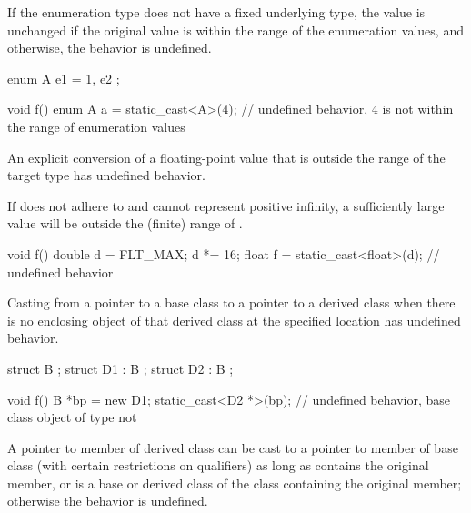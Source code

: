 
\pnum
If the enumeration type does not have a fixed underlying type,
the value is unchanged if the original value
is within the range of the enumeration values,
and otherwise, the behavior is undefined.

\pnum
\begin{example}
\begin{codeblock}
enum A { e1 = 1, e2 };

void f() {
  enum A a = static_cast<A>(4); // undefined behavior, $4$ is not within the range of enumeration values
}
\end{codeblock}
\end{example}


\pnum
An explicit conversion of a floating-point value
that is outside the range of the target type
has undefined behavior.

\pnum
\begin{example}
If  does not adhere to \IsoFloatUndated{}
and cannot represent positive infinity,
a sufficiently large  value will be
outside the (finite) range of .
\begin{codeblock}
void f() {
  double d = FLT_MAX;
  d *= 16;
  float f = static_cast<float>(d);  // undefined behavior
}
\end{codeblock}
\end{example}


\pnum
Casting from a pointer to a base class to a pointer to a derived class
when there is no enclosing object of that derived class at the
specified location has undefined behavior.

\pnum
\begin{example}
\begin{codeblock}
struct B {};
struct D1 : B {};
struct D2 : B {};

void f() {
  B *bp = new D1;
  static_cast<D2 *>(bp);        // undefined behavior, base class object of type  not 
}
\end{codeblock}
\end{example}


\pnum
A
pointer to member of derived class 
can be cast to
a pointer to member of base class 
(with certain restrictions on \cv{} qualifiers)
as long as  contains the original member,
or is a base or derived class of the class
containing the original member;
otherwise the behavior is undefined.

